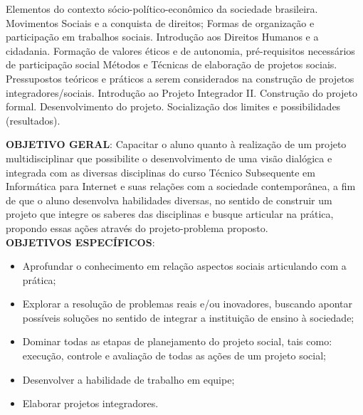 \begin{pud}

	
	
	\ementa
	Elementos do contexto sócio-político-econômico da sociedade brasileira.  Movimentos Sociais e a conquista de direitos; Formas de organização e participação em trabalhos sociais. Introdução aos Direitos Humanos e a cidadania.  Formação de valores éticos e de autonomia, pré-requisitos necessários de participação social Métodos e Técnicas de elaboração de projetos sociais. Pressupostos teóricos e práticos a serem considerados na construção de projetos integradores/sociais. Introdução ao Projeto Integrador II. Construção do projeto formal. Desenvolvimento do projeto. Socialização dos limites e possibilidades (resultados).
	
	\objetivos
	\textbf{OBJETIVO GERAL}:
	Capacitar o aluno quanto à realização de um projeto multidisciplinar que possibilite o desenvolvimento de uma visão dialógica e integrada com as diversas disciplinas do curso Técnico Subsequente em Informática para Internet e suas relações com a sociedade contemporânea, a fim de que o aluno desenvolva habilidades diversas, no sentido de construir um projeto que integre os saberes das disciplinas e busque articular na prática, propondo essas ações através do projeto-problema proposto.	
	\newline\\	
	\textbf{OBJETIVOS ESPECÍFICOS}:
	\begin{itemize}
		
		\item Aprofundar o conhecimento em relação  aspectos sociais articulando com a  prática;
		\item  Explorar a resolução de problemas reais e/ou inovadores, buscando apontar possíveis soluções   no sentido de integrar a instituição de ensino à sociedade;
		\item Dominar todas as etapas de planejamento do projeto social, tais como: execução, controle e avaliação de todas as ações de um projeto social;
		\item Desenvolver a habilidade de trabalho em equipe;
		\item Elaborar projetos integradores. 

	\end{itemize}	
	

\end{pud}
